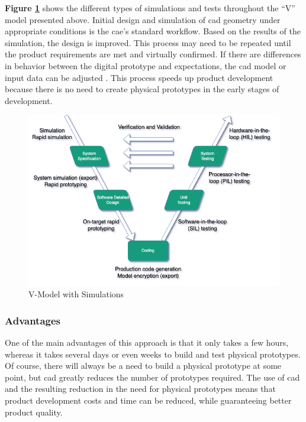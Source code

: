     \textbf{Figure \ref{fig:v-model-sim}} shows the different types of simulations and tests throughout the “V” model presented above. Initial design and simulation of \acrfull{cad} geometry under appropriate conditions is the \acrshort{cae}'s standard workflow. Based on the results of the simulation, the design is improved. This process may need to be repeated until the product requirements are met and virtually confirmed. If there are differences in behavior between the digital prototype and expectations, the \acrshort{cad} model or input data can be adjusted \cite{sellgren1999simulation, jeon2016automatic}. This process speeds up product development because there is no need to create physical prototypes in the early stages of development.

    \begin{figure}[h]
        \centering
        \includegraphics[scale=0.6]{images/Foundation-V-Model-Sim.drawio.png}
        \caption{\label{fig:v-model-sim} V-Model with Simulations \cite{validVerifSys} }
    \end{figure}


    \subsubsection{Advantages}
    One of the main advantages of this approach is that it only takes a few hours, whereas it takes several days or even weeks to build and test physical prototypes. Of course, there will always be a need to build a physical prototype at some point, but \acrshort{cad} greatly reduces the number of prototypes required. The use of \acrshort{cad} and the resulting reduction in the need for physical prototypes means that product development costs and time can be reduced, while guaranteeing better product quality.\\

